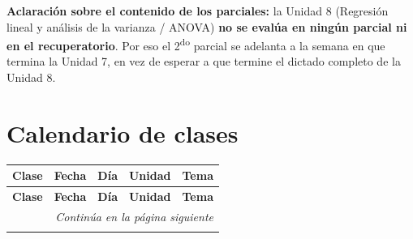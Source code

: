 \documentclass[11pt,a4paper]{article}
\begin{document}
\vspace{0.5em}
\begin{center}
\parbox{0.9\textwidth}{\small \textbf{Aclaración sobre el contenido de los parciales:} la Unidad 8 (Regresión lineal y análisis de la varianza / ANOVA) \textbf{no se evalúa en ningún parcial ni en el recuperatorio}. Por eso el 2\textsuperscript{do} parcial se adelanta a la semana en que termina la Unidad 7, en vez de esperar a que termine el dictado completo de la Unidad 8.}
\end{center}

\newpage
\section*{Calendario de clases}

\small
\begin{longtable}{@{}c l l c p{7.0cm}@{}}
\toprule
\textbf{Clase} & \textbf{Fecha} & \textbf{Día} & \textbf{Unidad} & \textbf{Tema} \\
\midrule
\endfirsthead
\toprule
\textbf{Clase} & \textbf{Fecha} & \textbf{Día} & \textbf{Unidad} & \textbf{Tema} \\
\midrule
\endhead
\midrule \multicolumn{5}{r}{\textit{Continúa en la página siguiente}} \\
\endfoot
\bottomrule
\endlastfoot


\end{longtable}
\end{document}
